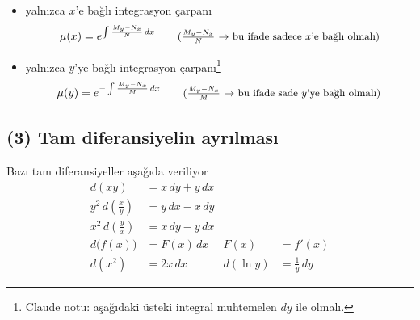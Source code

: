\documentclass[11pt,a4paper]{article}
\begin{document}
\begin{itemize}[label=$\bigstar$]
  \item yalnızca $x$'e bağlı integrasyon çarpanı
  \[
    \mu(x) = e^{\int \frac{M_y - N_x}{N}\,dx}
    \qquad \text{\small ($\tfrac{M_y - N_x}{N}$ $\rightarrow$ bu ifade sadece $x$'e bağlı olmalı)}
  \]
  \item yalnızca $y$'ye bağlı integrasyon çarpanı\footnote{Claude notu: aşağıdaki üsteki integral muhtemelen $dy$ ile olmalı.}
  \[
    \mu(y) = e^{-\int \frac{M_y - N_x}{M}\,dx}
    \qquad \text{\small ($\tfrac{M_y - N_x}{M}$ $\rightarrow$ bu ifade sade $y$'ye bağlı olmalı)}
  \]
\end{itemize}

\subsection{(3) Tam diferansiyelin ayrılması}

Bazı tam diferansiyeller aşağıda veriliyor
\begin{align*}
  d(xy) &= x\,dy + y\,dx\\
  y^2\,d\!\left(\frac{x}{y}\right) &= y\,dx - x\,dy\\
  x^2\,d\!\left(\frac{y}{x}\right) &= x\,dy - y\,dx\\
  d\bigl(f(x)\bigr) &= F(x)\,dx & F(x) &= f'(x)\\
  d(x^2) &= 2x\,dx & d(\ln y) &= \frac{1}{y}\,dy
\end{align*}
\end{document}
